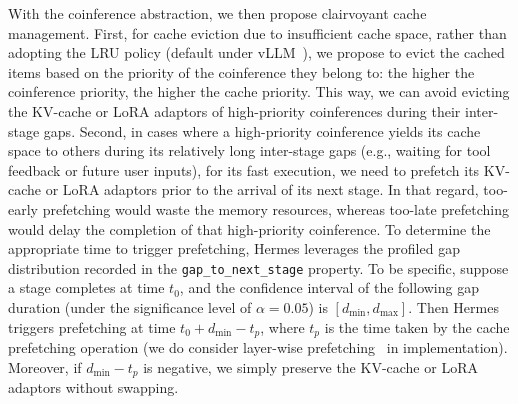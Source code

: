 With the coinference abstraction, we then propose clairvoyant cache management.
First, for cache eviction due to insufficient cache space, rather than adopting the LRU policy (default under vLLM~\cite{kwon2023efficient}), we propose to evict the cached items based on the priority of the coinference they belong to: the higher the coinference priority, the higher the cache priority.
This way, we can avoid evicting the KV-cache or LoRA adaptors of high-priority coinferences during their inter-stage gaps.
Second, in cases where a high-priority coinference yields its cache space to others during its relatively long inter-stage gaps (e.g., waiting for tool feedback or future user inputs), for its fast execution, we need to prefetch its KV-cache or LoRA adaptors prior to the arrival of its next stage.
In that regard, too-early prefetching would waste the memory resources, whereas too-late prefetching would delay the completion of that high-priority coinference.
To determine the appropriate time to trigger prefetching, Hermes leverages the profiled gap distribution recorded in the \texttt{gap\_to\_next\_stage} property.
To be specific, suppose a stage completes at time $t_0$, and the confidence interval of the following gap duration (under the significance level of $\alpha=0.05$) is $[d_\text{min}, d_\text{max}]$.
Then Hermes triggers prefetching at time $t_0+d_\text{min} - t_p$, where $t_p$ is the time taken by the cache prefetching operation (we do consider layer-wise prefetching~\cite{gao2024cost} in implementation).
Moreover, if $d_\text{min} - t_p$ is negative, we simply preserve the KV-cache or LoRA adaptors without swapping.

